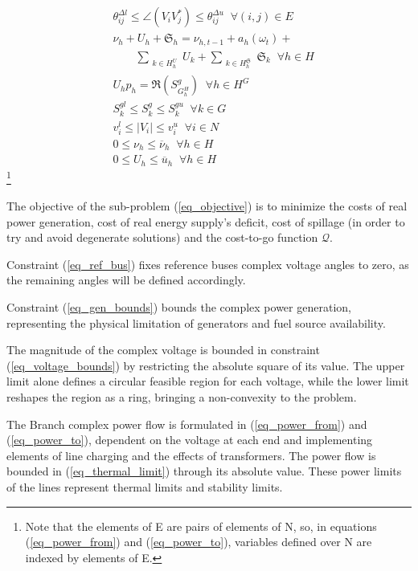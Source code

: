 \documentclass{juliacon}
\begin{document}
\begin{subequations}
\begin{align}
& \theta^{\Delta l}_{ij} \leq \angle (V_i V^*_j) \leq \theta^{\Delta u}_{ij} \;\; \forall (i,j) \in E \label{eq_angle_difference}  \\
& \nu_h + U_h + \mathfrak{S}_h = \nu_{h,t-1} + a_h(\omega_t) + \nonumber \\ 
& \qquad  \sum_{\substack{k \in H^U_h}} U_k + \sum_{\substack{k \in H^{\mathfrak{S}}_h}} \mathfrak{S}_k \;\; \forall h \in H \label{eq_hydro_balance} \\
& U_h p_h = \Re(S^g_{G^H_h}) \;\; \forall h \in H^G \label{eq_hydro_generation} \\
& S^{gl}_k \leq S^g_k \leq S^{gu}_k \;\; \forall k \in G  \label{eq_gen_bounds}\\
& v^l_i \leq |V_i| \leq v^u_i \;\; \forall i \in N \label{eq_voltage_bounds}\\
& 0 \leq \nu_h \leq \overline{\nu}_h \;\; \forall h \in H \label{eq_volume_limit}\\
& 0 \leq U_h \leq \overline{u}_h \;\; \forall h \in H \label{eq_outflow_limit}
%
\end{align}
\end{subequations}
\footnote{Note that the elements of E are pairs of elements of N, so, in equations (\ref{eq_power_from}) and (\ref{eq_power_to}), variables defined over N are indexed by elements of E.}

The objective of the sub-problem (\ref{eq_objective}) is to minimize the costs of real power generation, cost of real energy supply's deficit, cost of spillage (in order to try and avoid degenerate solutions) and the cost-to-go function $\mathcal{Q}$.

Constraint (\ref{eq_ref_bus}) fixes reference buses complex voltage angles to zero, as the remaining angles will be defined accordingly. 

Constraint (\ref{eq_gen_bounds}) bounds the complex power generation, representing the physical limitation of generators and fuel source availability.

The magnitude of the complex voltage is bounded in constraint (\ref{eq_voltage_bounds}) by restricting the absolute square of its value. The upper limit alone defines a circular feasible region for each voltage, while the lower limit reshapes the region as a ring, bringing a non-convexity to the problem.

The Branch complex power flow is formulated in (\ref{eq_power_from}) and (\ref{eq_power_to}), dependent on the voltage at each end and implementing elements of line charging and the effects of transformers. 
The power flow is bounded in (\ref{eq_thermal_limit}) through its absolute value. These power limits of the lines represent thermal limits and stability limits.
\end{document}
